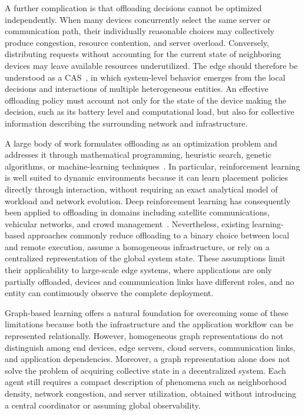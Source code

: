 A further complication is that offloading decisions cannot be optimized independently.
%
When many devices concurrently select the same server or communication path, 
 their individually reasonable choices may collectively produce congestion, 
 resource contention, and server overload.
%
Conversely, 
 distributing requests without accounting for the current state of neighboring devices 
 may leave available resources underutilized.
%
The edge should therefore be understood as a \gls{CAS}~\cite{DBLP:conf/huc/Ferscha15}, 
 in which system-level behavior emerges from the local decisions
 and interactions of multiple heterogeneous entities.
%
An effective offloading policy must account not only for the state of the device making the decision, 
 such as its battery level and computational load, 
 but also for collective information describing the surrounding network and infrastructure.

A large body of work formulates offloading as an optimization problem and addresses it through mathematical programming, 
 heuristic search, genetic algorithms, or machine-learning 
 techniques~\cite{DBLP:journals/comsur/MachB17,DBLP:journals/jnca/LinZCLW20,DBLP:journals/jsa/IslamDGC21,DBLP:journals/cn/SaeikASSDVLAMP21,DBLP:journals/tvt/Al-HabobDAM20}.
%
In particular, 
 reinforcement learning is well suited to dynamic environments because it can learn placement policies directly through interaction, 
 without requiring an exact analytical model of workload and network evolution.
%
Deep reinforcement learning has consequently been applied to offloading in domains including satellite communications, 
 vehicular networks, and crowd management~\cite{DBLP:journals/tvt/ChaiZYXGG23,DBLP:journals/iotj/CuiLZZLQ23,DBLP:journals/tits/WangPLQRWYZZ23}.
%
Nevertheless, 
 existing learning-based approaches commonly reduce offloading to a binary choice between local and remote execution,
  assume a homogeneous infrastructure, or rely on a centralized representation of the global system state.
%
These assumptions limit their applicability to large-scale edge systems, where applications are only partially offloaded, 
 devices and communication links have different roles, and no entity can continuously observe the complete deployment.

Graph-based learning offers a natural foundation for overcoming some of these limitations because 
 both the infrastructure and the application workflow can be represented relationally.
%
However, 
 homogeneous graph representations do not distinguish among end devices, 
 edge servers, cloud servers, communication links, and application dependencies.
%
Moreover, 
 a graph representation alone does not solve the problem of acquiring collective state in a decentralized system.
%
Each agent still requires a compact description of phenomena such as neighborhood density, 
 network congestion, and server utilization, obtained without introducing a central coordinator 
 or assuming global observability.

